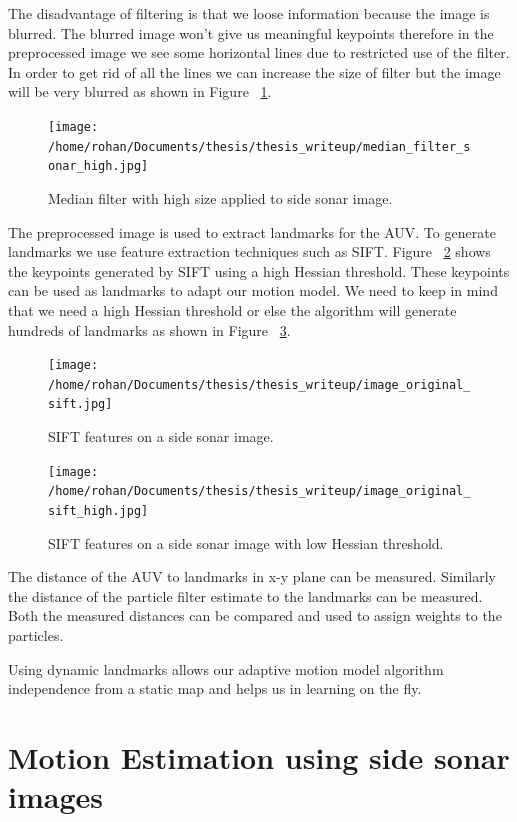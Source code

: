 \documentclass[12pt]{dalcsthesis}
\begin{document}
The disadvantage of filtering is that we loose information because the image is blurred. The blurred image won't give us meaningful keypoints therefore in the preprocessed image we see some horizontal lines due to restricted use of the filter. In order to get rid of all the lines we can increase the size of filter but the image will be very blurred as shown in Figure ~\ref{fig- side sonar median high}.
\begin{figure}
  \centering
     {\texttt{[image: /home/rohan/Documents/thesis/thesis\_writeup/median\_filter\_sonar\_high.jpg]}}
  \caption{\label{fig- side sonar median high} Median filter with high size applied to side sonar image.}
\end{figure}

The preprocessed image is used to extract landmarks for the AUV. To generate landmarks we use feature extraction techniques such as SIFT. Figure ~\ref{fig- side sonar sift} shows the keypoints generated by SIFT using a high Hessian threshold. These keypoints can be used as landmarks to adapt our motion model. We need to keep in mind that we need a high Hessian threshold or else the algorithm will generate hundreds of landmarks as shown in Figure ~\ref{fig- side sonar sift high}.
\begin{figure}
  \centering
     {\texttt{[image: /home/rohan/Documents/thesis/thesis\_writeup/image\_original\_sift.jpg]}}
  \caption{\label{fig- side sonar sift} SIFT features on a side sonar image.}
\end{figure}

\begin{figure}
  \centering
     {\texttt{[image: /home/rohan/Documents/thesis/thesis\_writeup/image\_original\_sift\_high.jpg]}}
  \caption{\label{fig- side sonar sift high} SIFT features on a side sonar image with low Hessian threshold.}
\end{figure}


The distance of the AUV to landmarks in x-y plane can be measured. Similarly the distance of the particle filter estimate to the landmarks can be measured. Both the measured distances can be compared and used to assign weights to the particles. 

Using dynamic landmarks allows our adaptive motion model algorithm independence from a static map and helps us in learning on the fly.  

\section{Motion Estimation using side sonar images}
\end{document}
